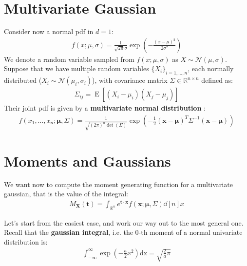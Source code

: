 \documentclass[../template.tex]{subfiles}
\begin{document}
\section{Multivariate Gaussian}
Consider now a normal pdf in $d=1$:
\begin{align*}
    f(x;\mu,\sigma) = \frac{1}{\sqrt{2 \pi}\sigma} \exp\left(-\frac{(x-\mu)^2}{2\sigma^2} \right) 
\end{align*} 
We denote a random variable sampled from $f(x;\mu,\sigma)$ as $X \sim \mathcal{N}(\mu,\sigma)$.\\
Suppose that we have multiple random variables $\{X_i\}_{i=1,\dots,n}$, each normally distributed ($X_i \sim \mathcal{N}(\mu_i, \sigma_i)$), with covariance matrix $\Sigma \in \mathbb{R}^{n\times n}$ defined as:
\begin{align*}
    \Sigma_{ij} = \operatorname{E}[(X_i- \mu_i)(X_j - \mu_j)] 
\end{align*}
Their joint pdf is given by a \textbf{multivariate normal distribution} :
\begin{align*}
    f(x_1, \dots, x_n; \bm{\mu}, \Sigma) = \frac{1}{\sqrt{(2\pi)^n \operatorname{det}(\Sigma) }} \exp \left(-\frac{1}{2}(\bm{x}- \bm{\mu})^T \Sigma^{-1} (\bm{x} - \bm{\mu}) \right) 
\end{align*}

\section{Moments and Gaussians}
We want now to compute the moment generating function for a multivariate gaussian, that is the value of the integral:
\begin{align}
    M_{\bm{X}}(\bm{t}) = \int_{\mathbb{R}^n} e^{\bm{t}\cdot \bm{x}} f(\bm{x};\bm{\mu},\Sigma) \dd[n]{x}
    \label{eqn:multivariate_moment}
\end{align} 

Let's start from the easiest case, and work our way out to the most general one.\\

Recall that the \textbf{gaussian integral}, i.e. the $0$-th moment of a normal univariate distribution is:
\begin{align*}
    \int_{-\infty}^{\infty} \exp\left(-\frac{a}{2}x^2 \right) \mathrm{dx} = \sqrt{\frac{2}{a} \pi } 
\end{align*}
\end{document}
